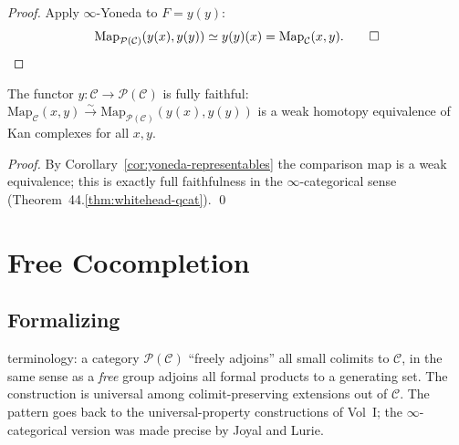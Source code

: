 \begin{proof}
Apply $\infty$-Yoneda to $F = y(y)$:
\begin{equation*}
  \mathrm{Map}_{\mathcal{P}(\mathcal{C})}(y(x), y(y)) \simeq y(y)(x) = \mathrm{Map}_\mathcal{C}(x, y). \qed
\end{equation*}
\end{proof}

\begin{theorem}
\label{thm:yoneda-ff}
The functor $y : \mathcal{C} \to \mathcal{P}(\mathcal{C})$ is fully
faithful: $\mathrm{Map}_\mathcal{C}(x, y) \xrightarrow{\sim}
\mathrm{Map}_{\mathcal{P}(\mathcal{C})}(y(x), y(y))$ is a weak homotopy
equivalence of Kan complexes for all $x, y$.
\end{theorem}

\begin{proof}
By Corollary~\ref{cor:yoneda-representables} the comparison map is a
weak equivalence; this is exactly full faithfulness in the
$\infty$-categorical sense (Theorem~44.\ref{thm:whitehead-qcat}).
\qed
\end{proof}


\section{Free Cocompletion}
\label{sec:free-cocompletion}

\subsection{Formalizing}

\begin{nameorigin}
 terminology: a category $\mathcal{P}(\mathcal{C})$
``freely adjoins'' all small colimits to $\mathcal{C}$, in the same
sense as a \emph{free} group adjoins all formal products to a generating
set. The construction is universal among colimit-preserving extensions
out of $\mathcal{C}$. The pattern goes back to the universal-property
constructions of Vol~I; the $\infty$-categorical version was made
precise by Joyal and Lurie.
\end{nameorigin}

